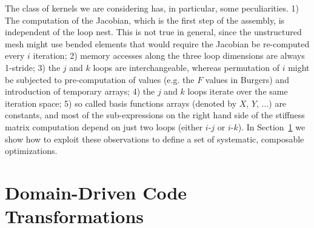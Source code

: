 \documentclass[conference]{IEEEtran}
\begin{document}
The class of kernels we are considering has, in particular, some peculiarities. 1) The computation of the Jacobian, which is the first step of the assembly, is independent of the loop nest. This is not true in general, since the unstructured mesh might use bended elements that would require the Jacobian be re-computed every $i$ iteration; 2) memory accesses along the three loop dimensions are always 1-stride; 3) the $j$ and $k$ loops are interchangeable, whereas permutation of $i$ might be subjected to pre-computation of values (e.g. the $F$ values in Burgers) and introduction of temporary arrays; 4) the $j$ and $k$ loops iterate over the same iteration space; 5) so called basis functions arrays (denoted by $X$, $Y$, ...) are constants, and most of the sub-expressions on the right hand side of the stiffness matrix computation depend on just two loops (either $i$-$j$ or $i$-$k$). In Section~\ref{sec:code-transf} we show how to exploit these observations to define a set of systematic, composable optimizations.


\section{Domain-Driven Code Transformations}
\label{sec:code-transf}
\end{document}
